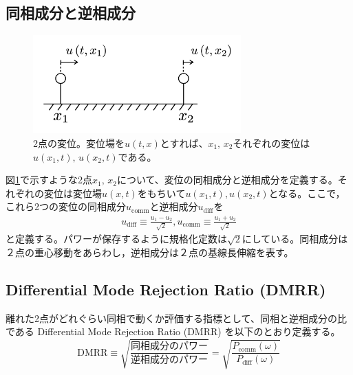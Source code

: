 \documentclass[a4paper,12pt]{jsarticle}
\begin{document}
\subsection{同相成分と逆相成分}
\begin{figure}[H]
  \begin{center}
    \includegraphics[width=8.0cm]{./img_cdmr_xarm.png}
  \end{center}
  \caption{2点の変位。変位場を$u(t,x)$とすれば、$x_1,\,x_2$それぞれの変位は$u(x_1,t),\,u(x_2,t)$である。}\label{img:img_diffcomm}
\end{figure}

図\ref{img:img_diffcomm}で示すような2点$x_1,\,x_2$について、変位の同相成分と逆相成分を定義する。それぞれの変位は変位場$u(x,t)$をもちいて$u(x_1,t),u(x_2,t)$となる。ここで，これら2つの変位の同相成分$u_{\mathrm{comm}}$と逆相成分$u_\mathrm{diff}$を
\begin{eqnarray}\label{eq:eq22}
  u_{\mathrm{diff}} \equiv \frac{u_{1}-u_{2}}{\sqrt{2}},
  u_{\mathrm{comm}}  \equiv \frac{u_{1}+u_{2}}{\sqrt{2}}
\end{eqnarray}
と定義する。パワーが保存するように規格化定数は$\sqrt{2}$にしている。同相成分は２点の重心移動をあらわし，逆相成分は２点の基線長伸縮を表す。


\subsection{Differential Mode Rejection Ratio (DMRR)}
離れた2点がどれぐらい同相で動くか評価する指標として、同相と逆相成分の比である Differential Mode Rejection Ratio (DMRR) を以下のとおり定義する。
\begin{equation}
  \boxed{\mathrm{DMRR} \equiv \sqrt{\frac{同相成分のパワー}{逆相成分のパワー}} = \sqrt{\frac{P_{\mathrm{comm}}(\omega)}{P_{\mathrm{diff}}(\omega)}}} \label{eq:eq23}
\end{equation}
\end{document}
